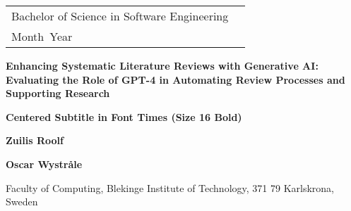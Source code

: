 \documentclass[a4paper,twoside]{bth}
\newcommand{\thesisDegree}{Bachelor of Science in Software Engineering}
\newcommand{\thesisMonth}{Month}
\newcommand{\thesisYear}{Year}
\newcommand{\faculty}{Computing}
\newcommand{\thesisTitle}{Enhancing Systematic Literature Reviews with Generative AI: Evaluating the Role of GPT-4 in Automating Review Processes and Supporting Research}
\newcommand{\thesisSubtitle}{Centered Subtitle in Font Times (Size 16 Bold)}
\newcommand{\authorFirst}{Zuilis Roolf}
\newcommand{\authorSecond}{Oscar Wystråle}
\begin{document}
\pagestyle{plain}

{\pagestyle{empty}
\changepage{3cm}{1cm}{-0.5cm}{-0.5cm}{}{-1.5cm}{}{}{}
\noindent
\begin{tabular}{@{}p{} p{}}
\thesisDegree & \hfill\multirow{3}{*}{\bthcsnotextlogo{3cm}} \\
\thesisMonth \ \thesisYear & \\
\end{tabular}

\center
\vspace {7.5cm}
{\Huge\textbf{\thesisTitle}}

\vspace {0.5cm}
{\Large\textbf{\thesisSubtitle}}

\vspace{2cm}
{\Large\textbf{\authorFirst}}

\vspace{0.3cm}
{\Large\textbf{\authorSecond}}

\vspace*{\fill}

\noindent\makebox[\linewidth]{\rule{\textwidth}{1pt}} 
Faculty of \faculty, Blekinge Institute of Technology, 371 79 Karlskrona, Sweden

\clearpage
} %
\end{document}
